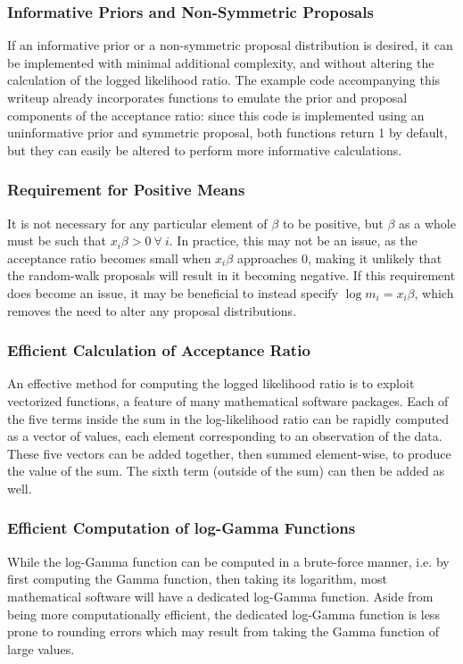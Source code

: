 \documentclass[12pt]{article}
\begin{document}
	\subsubsection{Informative Priors and Non-Symmetric Proposals}
	If an informative prior or a non-symmetric proposal distribution is desired, it can be implemented with minimal additional complexity, and without altering the calculation of the logged likelihood ratio. The example code accompanying this writeup already incorporates functions to emulate the prior and proposal components of the acceptance ratio: since this code is implemented using an uninformative prior and symmetric proposal, both functions return 1 by default, but they can easily be altered to perform more informative calculations.
	
	\subsubsection{Requirement for Positive Means}
	It is not necessary for any particular element of $\beta$ to be positive, but $\beta$ as a whole must be such that $x_i \beta > 0~\forall~i$. In practice, this may not be an issue, as the acceptance ratio becomes small when $x_i\beta$ approaches 0, making it unlikely that the random-walk proposals will result in it becoming negative. If this requirement does become an issue, it may be beneficial to instead specify $\log m_i = x_i \beta$, which removes the need to alter any proposal distributions.
	
	\subsubsection{Efficient Calculation of Acceptance Ratio}
	An effective method for computing the logged likelihood ratio is to exploit vectorized functions, a feature of many mathematical software packages. Each of the five terms inside the sum in the log-likelihood ratio can be rapidly computed as a vector of values, each element corresponding to an observation of the data. These five vectors can be added together, then summed element-wise, to produce the value of the sum. The sixth term (outside of the sum) can then be added as well.
	
	\subsubsection{Efficient Computation of log-Gamma Functions}
	While the log-Gamma function can be computed in a brute-force manner, i.e. by first computing the Gamma function, then taking its logarithm, most mathematical software will have a dedicated log-Gamma function. Aside from being more computationally efficient, the dedicated log-Gamma function is less prone to rounding errors which may result from taking the Gamma function of large values.
	
\end{document}
